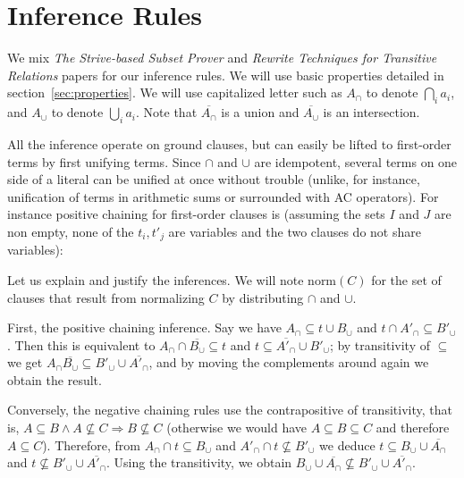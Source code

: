 \documentclass{article}
\newcommand{\compl}[1]{\ensuremath{\overline{#1}}}
\newcommand{\normalize}[1]{\ensuremath{\text{norm}(#1)}}
\begin{document}

\section{Inference Rules}
We mix \emph{The Strive-based Subset Prover} and
\emph{Rewrite Techniques for Transitive Relations} papers for our
inference rules.
We will use basic properties detailed in section~\ref{sec:properties}.
We will use capitalized
letter such as $A_\cap$ to denote $\bigcap_i a_i$, and $A_\cup$ to denote
$\bigcup_i a_i$. Note that $\compl{A_\cap}$ is a union and
$\compl{A_\cup}$ is an intersection.

All the inference operate on ground clauses, but can easily be lifted to
first-order terms by first unifying terms. Since $\cap$ and $\cup$ are
idempotent, several terms on one side of a literal can be unified at once
without trouble (unlike, for instance, unification of terms in arithmetic
sums or surrounded with AC operators). For instance positive chaining
for first-order clauses is (assuming the sets $I$ and $J$ are non empty,
none of the $t_i, t'_j$ are variables
and the two clauses do not share variables):

\begin{prooftree}
\end{prooftree}

Let us explain and justify the inferences. We will note $\normalize{C}$ for
the set of clauses that result from normalizing $C$ by distributing $\cap$
and $\cup$.

First, the positive chaining inference. Say we have $A_\cap \subseteq t\cup B_\cup$
and $t \cap A'_\cap \subseteq B'_\cup$. Then this is equivalent
to $A_\cap \cap \compl{B_\cup} \subseteq t$ and
$t \subseteq \compl{A'_\cap}\cup B'_\cup$; by transitivity of
$\subseteq$ we get
$A_\cap \compl{B_\cup} \subseteq B'_\cup \cup \compl{A'_\cap}$, and by moving
the complements around again we obtain the result.

Conversely, the negative chaining rules use the contrapositive of transitivity,
that is, $A \subseteq B \land A \not\subseteq C \Rightarrow B \not\subseteq C$
(otherwise we would have $A \subseteq B \subseteq C$ and therefore $A \subseteq
C$).
Therefore, from $A_\cap \cap t \subseteq B_\cup$ and
$A'_\cap \cap t \not\subseteq B'_\cup$ we deduce
$t \subseteq B_\cup \cup \compl{A_\cap}$ and
$t \not\subseteq B'_\cup \cup \compl{A'_\cap}$. Using the transitivity,
we obtain $B_\cup \cup \compl{A_\cap} \not\subseteq B'_\cup \cup \compl{A'_\cap}$.
\end{document}
